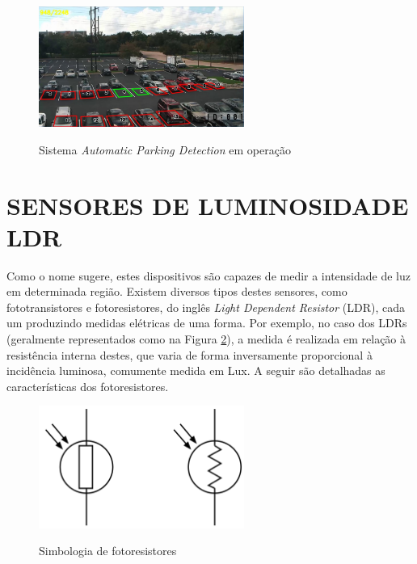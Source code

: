 \documentclass[oneside,openright,12pt]{ufsm_2015} %
\begin{document}
\begin{figure}[H]
    \caption{\label{exepretex} Sistema \textit{Automatic Parking Detection} em operação}
    \centering
    \includegraphics[width=0.6\textwidth]{figuras/automatic-parking-detection.png}
    \vspace{\baselineskip} %
        \label{fig:repoparking}
\end{figure}

\section{SENSORES DE LUMINOSIDADE LDR}
Como o nome sugere, estes dispositivos são capazes de medir a intensidade de luz em determinada região. Existem diversos tipos destes sensores, como fototransistores e fotoresistores, do inglês \textit{Light Dependent Resistor} (LDR), cada um produzindo medidas elétricas de uma forma. Por exemplo, no caso dos LDRs (geralmente representados como na Figura \ref{fig:ldr-simbolo}), a medida é realizada em relação à resistência interna destes, que varia de forma inversamente proporcional à incidência luminosa, comumente medida em Lux. A seguir são detalhadas as características dos fotoresistores.
\begin{figure}[ht]
    \caption{\label{exepretex} Simbologia de fotoresistores}
    \centering
    \includegraphics[width=0.6\textwidth]{figuras/ldrsymbol.png}
    \vspace{\baselineskip} %
        \label{fig:ldr-simbolo}
\end{figure}
\end{document}
